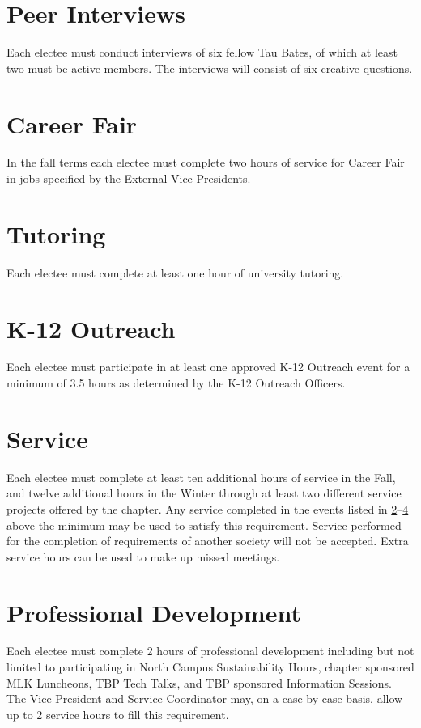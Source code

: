 \section{Peer Interviews} Each electee must conduct interviews of six fellow Tau Bates, of which at least two must be active members. The interviews will consist of six creative questions. 
\section{Career Fair}\label{ugrad:CF} In the fall terms each electee must complete two hours of service for Career Fair in jobs specified by the External Vice Presidents. 
\section{Tutoring} Each electee must complete at least one hour of university tutoring. %
\section{K-12 Outreach} \label{ugrad:MindSET} Each electee must participate in at least one approved K-12 Outreach event for a minimum of 3.5 hours as determined by the K-12 Outreach Officers. %
\section{Service} Each electee must complete at least ten additional hours of service in the Fall, and twelve additional hours in the Winter through at least two different service projects offered by the chapter. Any service completed in the events listed in \ref{ugrad:CF}--\ref{ugrad:MindSET} above the minimum may be used to satisfy this requirement.  Service performed for the completion of requirements of another society will not be accepted. Extra service hours can be used to make up missed meetings. %
\section{Professional Development}\label{sec:ugpdreq} Each electee must complete 2 hours of professional development including but not limited to participating in North Campus Sustainability Hours, chapter sponsored MLK Luncheons, TBP Tech Talks, and TBP sponsored Information Sessions. The Vice President and Service Coordinator may, on a case by case basis, allow up to 2 service hours to fill this requirement. 
